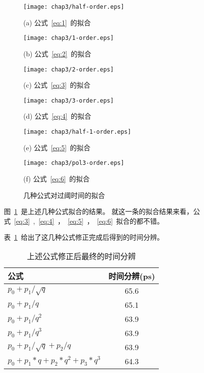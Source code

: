 \begin{figure}[!h]
\begin{minipage}{0.5\linewidth}
  \centerline{\texttt{[image: chap3/half-order.eps]}}
  \centerline{(a) 公式~\ref{eq:1}~的拟合}
  \centerline{\label{fig:half-order}}
\end{minipage}
\hfill
\begin{minipage}{0.5\linewidth}
  \centerline{\texttt{[image: chap3/1-order.eps]}}
  \centerline{(b) 公式~\ref{eq:2}~的拟合}
  \centerline{\label{fig:1-order}}
\end{minipage}
\vfill
\begin{minipage}{0.5\linewidth}
  \centerline{\texttt{[image: chap3/2-order.eps]}}
  \centerline{(c) 公式~\ref{eq:3}~的拟合}
  \centerline{\label{fig:2-order}}
\end{minipage}
\hfill
\begin{minipage}{0.5\linewidth}
  \centerline{\texttt{[image: chap3/3-order.eps]}}
  \centerline{(d) 公式~\ref{eq:4}~的拟合}
  \centerline{\label{fig:3-order}}
\end{minipage}
\vfill
\begin{minipage}{0.5\linewidth}
  \centerline{\texttt{[image: chap3/half-1-order.eps]}}
  \centerline{(e) 公式~\ref{eq:5}~的拟合}
  \centerline{\label{fig:half-1-order}}
\end{minipage}
\hfill
\begin{minipage}{0.5\linewidth}
  \centerline{\texttt{[image: chap3/pol3-order.eps]}}
  \centerline{(f) 公式~\ref{eq:6}~的拟合}
  \centerline{\label{fig:pol3-order}}
\end{minipage}
\caption{几种公式对过阈时间的拟合}
\label{fig:single-formula}
\end{figure}
图~\ref{fig:single-formula}~是上述几种公式拟合的结果。
就这一条的拟合结果来看，公式~\ref{eq:3}~,~\ref{eq:4}~，~\ref{eq:5}~，~\ref{eq:6}~拟合的都不错。

表~\ref{tbl:resolution}~给出了这几种公式修正完成后得到的时间分辨。

\begin{table}[h]
    \centering
    \caption{\label{tbl:resolution} 上述公式修正后最终的时间分辨}
  \footnotesize
    \begin{tabular}{lc}
        \hline
        公式& 时间分辨(ps) \\
        \hline
        ${p_{0}+p_{1}/\sqrt{q}}$ & 65.6 \\
        ${p_{0}+p_{1}/q}$ & 65.1 \\
        ${p_{0}+p_{1}/q^{2}}$ & 63.9 \\
        ${p_{0}+p_{1}/q^{3}}$ & 63.9 \\
        ${p_{0}+p_{1}/\sqrt{q}+p_{2}/q}$ & 63.9 \\
        ${p_{0}+p_{1}*q+p_{2}*q^{2}+p_{3}*q^3}$ & 64.3 \\
        \hline
    \end{tabular}
\end{table}

